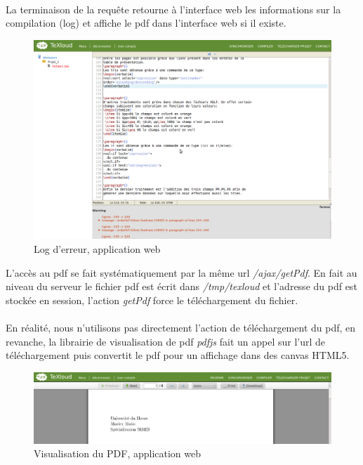\documentclass[a4paper,12pt]{article}
\begin{document}
\clearpage
\paragraph*{}
La terminaison de la requête retourne à l'interface web les informations sur la compilation (log) et affiche le pdf dans l'interface web si il existe.
\begin{figure}[!ht]
\begin{center}
  \includegraphics[width=1\textwidth]{./images/screenshot/CompileLog.png}
\end{center}
  \caption{Log d'erreur, application web}
  \label{compilation}
\end{figure}

L'accès au pdf se fait systématiquement par la même url \emph{/ajax/getPdf}.
En fait au niveau du serveur le fichier pdf est écrit dans \emph{/tmp/texloud} et l'adresse du pdf est stockée en session, l'action \emph{getPdf} force le téléchargement du fichier.

\clearpage
\paragraph*{}
En réalité, nous n'utilisons pas directement l'action de téléchargement du pdf, en revanche, la librairie de visualisation de pdf \emph{pdfjs} fait un appel sur l'url de téléchargement puis convertit le pdf pour un affichage dans des canvas HTML5.

\begin{figure}[!ht]
\begin{center}
  \includegraphics[width=1\textwidth]{./images/screenshot/pdfjs.png}
\end{center}
  \caption{Visualisation du PDF, application web}
  \label{compilation}
\end{figure}
\end{document}
